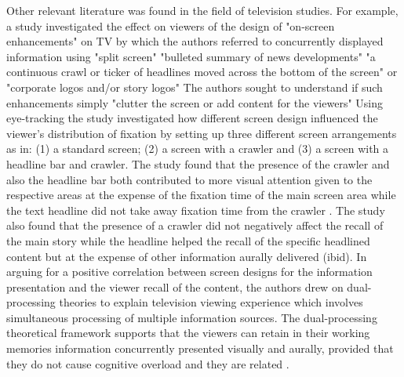 \documentclass[output=paper]{langsci/langscibook}
\begin{document}
Other relevant literature was found in the field of television studies. For example, a study \citep{josephson2006} investigated the effect on viewers of  the design of "on-screen enhancements" on TV by which the authors referred to concurrently displayed information using "split screen" "bulleted summary of news developments" "a continuous crawl or ticker of headlines moved across the bottom of the screen" or "corporate logos and/or story logos"  The authors sought to understand if such enhancements simply "clutter the screen or add content for the viewers" Using eye-tracking the study investigated how different screen design influenced the viewer's distribution of fixation by setting up three different screen arrangements as in: (1) a standard screen; (2) a screen with a crawler and (3) a screen with a headline bar and crawler.  The study found that the presence of the crawler and also the headline bar both contributed to more visual attention given to the respective areas at the expense of the fixation time of the main screen area while the text headline did not take away fixation time from the crawler \citep[p. 161]{josephson2006}. The study also found that the presence of a crawler did not negatively affect the recall of the main story while the headline helped the recall of the specific headlined content but at the expense of other information aurally delivered (ibid). In arguing for a positive correlation between screen designs for the information presentation and the viewer recall of the content, the authors drew on dual-processing theories to explain television viewing experience which involves simultaneous processing of multiple information sources. The dual-processing theoretical framework supports that the viewers can retain in their working memories information concurrently presented visually and aurally, provided that they do not cause cognitive overload and they are related \citep{Mayer1998}. 
\end{document}
